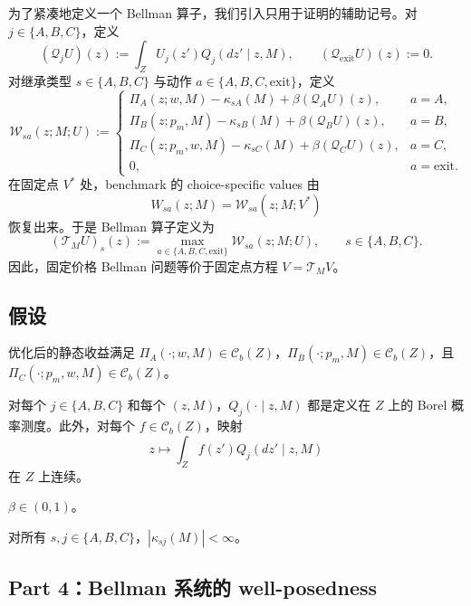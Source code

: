 为了紧凑地定义一个 Bellman 算子，我们引入只用于证明的辅助记号。对 $j\in\{A,B,C\}$，定义
\[
(\mathcal Q_jU)(z):=\int_Z U_j(z')Q_j(dz'\mid z,M),
\qquad
(\mathcal Q_{\mathrm{exit}}U)(z):=0.
\]
对继承类型 $s\in\{A,B,C\}$ 与动作 $a\in\{A,B,C,\mathrm{exit}\}$，定义
\[
\mathcal W_{sa}(z;M;U):=
\begin{cases}
\Pi_A(z;w,M)-\kappa_{sA}(M)+\beta(\mathcal Q_AU)(z), & a=A,\\
\Pi_B(z;p_m,M)-\kappa_{sB}(M)+\beta(\mathcal Q_BU)(z), & a=B,\\
\Pi_C(z;p_m,w,M)-\kappa_{sC}(M)+\beta(\mathcal Q_CU)(z), & a=C,\\
0, & a=\mathrm{exit}.
\end{cases}
\]
在固定点 $V^*$ 处，benchmark 的 choice-specific values 由
\[
W_{sa}(z;M)=\mathcal W_{sa}(z;M;V^*)
\]
恢复出来。于是 Bellman 算子定义为
\[
(\mathcal T_MU)_s(z):=\max_{a\in\{A,B,C,\mathrm{exit}\}}\mathcal W_{sa}(z;M;U),
\qquad s\in\{A,B,C\}.
\]
因此，固定价格 Bellman 问题等价于固定点方程 $V=\mathcal T_MV$。

\subsection{假设}

\begin{assumption}[R1: 流收益有界连续]
优化后的静态收益满足 $\Pi_A(\cdot;w,M)\in\mathcal C_b(Z)$，$\Pi_B(\cdot;p_m,M)\in\mathcal C_b(Z)$，且 $\Pi_C(\cdot;p_m,w,M)\in\mathcal C_b(Z)$。
\end{assumption}

\begin{assumption}
对每个 $j\in\{A,B,C\}$ 和每个 $(z,M)$，$Q_j(\cdot\mid z,M)$ 都是定义在 $Z$ 上的 Borel 概率测度。此外，对每个 $f\in\mathcal C_b(Z)$，映射
\[
z\mapsto\int_Z f(z')Q_j(dz'\mid z,M)
\]
在 $Z$ 上连续。
\end{assumption}

\begin{assumption}[R3: 折现]
$\beta\in(0,1)$。
\end{assumption}

\begin{assumption}[R4: 切换成本有限]
对所有 $s,j\in\{A,B,C\}$，$|\kappa_{sj}(M)|<\infty$。
\end{assumption}

\subsection{Part 4：Bellman 系统的 well-posedness}

